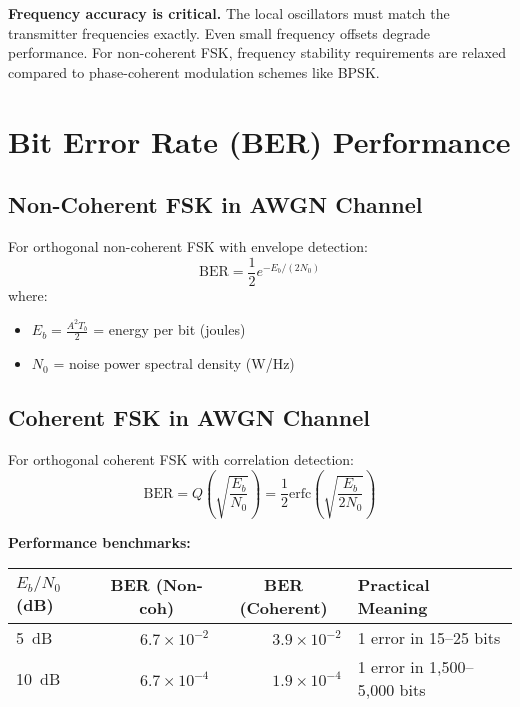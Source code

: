 \begin{warningbox}
\textbf{Frequency accuracy is critical.} The local oscillators must match the transmitter frequencies exactly. Even small frequency offsets degrade performance. For non-coherent FSK, frequency stability requirements are relaxed compared to phase-coherent modulation schemes like BPSK.
\end{warningbox}

\section{Bit Error Rate (BER) Performance}

\subsection{Non-Coherent FSK in AWGN Channel}

For orthogonal non-coherent FSK with envelope detection:
\begin{equation}
\mathrm{BER} = \frac{1}{2}e^{-E_b/(2N_0)}
\end{equation}
where:
\begin{itemize}
\item $E_b = \frac{A^2 T_b}{2}$ = energy per bit (joules)
\item $N_0$ = noise power spectral density (W/Hz)
\end{itemize}

\subsection{Coherent FSK in AWGN Channel}

For orthogonal coherent FSK with correlation detection:
\begin{equation}
\mathrm{BER} = Q\left(\sqrt{\frac{E_b}{N_0}}\right) = \frac{1}{2}\mathrm{erfc}\left(\sqrt{\frac{E_b}{2N_0}}\right)
\end{equation}

\textbf{Performance benchmarks:}

\begin{center}
\begin{tabularx}{\textwidth}{@{}lrrX@{}}
\toprule
$E_b/N_0$ (dB) & \multicolumn{1}{c}{BER (Non-coh)} & \multicolumn{1}{c}{BER (Coherent)} & Practical Meaning \\
\midrule
5~dB & $6.7 \times 10^{-2}$ & $3.9 \times 10^{-2}$ & 1 error in 15--25 bits \\
10~dB & $6.7 \times 10^{-4}$ & $1.9 \times 10^{-4}$ & 1 error in 1,500--5,000 bits \\
12~dB & $1.2 \times 10^{-4}$ & $2.6 \times 10^{-5}$ & 1 error in 8,000--38,000 bits \\
15~dB & $3.7 \times 10^{-6}$ & $4.3 \times 10^{-7}$ & 1 error in $270$k--$2.3$M bits \\
\bottomrule
\end{tabularx}
\end{center}

